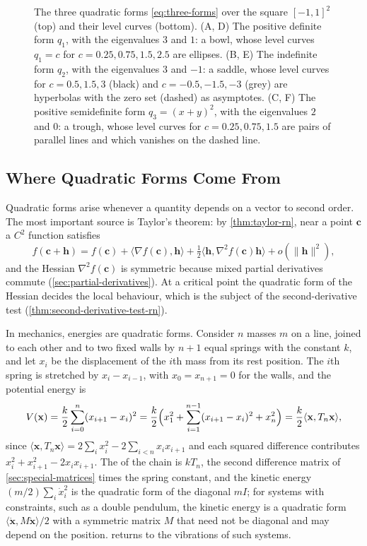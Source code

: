 \begin{figure}
\caption{The three quadratic forms \eqref{eq:three-forms} over the square $[-1,1]^2$ (top) and their level curves (bottom). (A, D) The positive definite form $q_1$, with the eigenvalues $3$ and $1$: a bowl, whose level curves $q_1=c$ for $c=0.25,0.75,1.5,2.5$ are ellipses. (B, E) The indefinite form $q_2$, with the eigenvalues $3$ and $-1$: a saddle, whose level curves for $c=0.5,1.5,3$ (black) and $c=-0.5,-1.5,-3$ (grey) are hyperbolas with the zero set (dashed) as asymptotes. (C, F) The positive semidefinite form $q_3=(x+y)^2$, with the eigenvalues $2$ and $0$: a trough, whose level curves for $c=0.25,0.75,1.5$ are pairs of parallel lines and which vanishes on the dashed line.\label{fig:quadratic-forms}}
\end{figure}

\subsection{Where Quadratic Forms Come From}

Quadratic forms arise whenever a quantity depends on a vector to second order. The most important source is Taylor's theorem: by \cref{thm:taylor-rn}, near a point $\mathbf c$ a $C^2$ function satisfies
\[
f(\mathbf c+\mathbf h)=f(\mathbf c)+\langle\nabla f(\mathbf c),\mathbf h\rangle+\tfrac12\langle\mathbf h,\nabla^2f(\mathbf c)\mathbf h\rangle+o(\|\mathbf h\|^2),
\]
and the Hessian $\nabla^2f(\mathbf c)$ is symmetric because mixed partial derivatives commute (\cref{sec:partial-derivatives}). At a critical point the quadratic form of the Hessian decides the local behaviour, which is the subject of the second-derivative test (\cref{thm:second-derivative-test-rn}).

In mechanics, energies are quadratic forms. Consider $n$ masses $m$ on a line, joined to each other and to two fixed walls by $n+1$ equal springs with the constant $k$, and let $x_i$ be the displacement of the $i$th mass from its rest position. The $i$th spring is stretched by $x_{i}-x_{i-1}$, with $x_0=x_{n+1}=0$ for the walls, and the potential energy is
\[
V(\mathbf x)=\frac k2\sum_{i=0}^{n}(x_{i+1}-x_i)^2=\frac k2\Bigl(x_1^2+\sum_{i=1}^{n-1}(x_{i+1}-x_i)^2+x_n^2\Bigr)=\frac k2\langle\mathbf x,T_n\mathbf x\rangle ,
\]
since $\langle\mathbf x,T_n\mathbf x\rangle=2\sum_ix_i^2-2\sum_{i<n}x_ix_{i+1}$ and each squared difference contributes $x_i^2+x_{i+1}^2-2x_ix_{i+1}$. The  of the chain is $kT_n$, the second difference matrix of \cref{sec:special-matrices} times the spring constant, and the kinetic energy $(m/2)\sum_i\dot x_i^2$ is the quadratic form of the diagonal  $mI$; for systems with constraints, such as a double pendulum, the kinetic energy is a quadratic form $\langle\dot{\mathbf x},M\dot{\mathbf x}\rangle/2$ with a symmetric matrix $M$ that need not be diagonal and may depend on the position.  returns to the vibrations of such systems.

